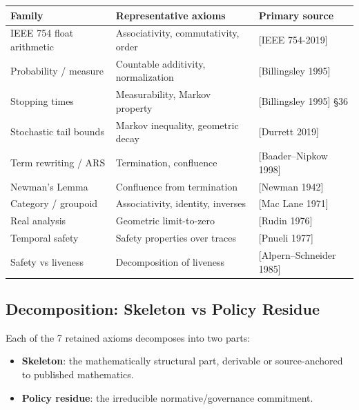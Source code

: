 \begin{center}
\begin{tabular}{lll}
\toprule
Family & Representative axioms & Primary source \\
\midrule
IEEE 754 float arithmetic & Associativity, commutativity, order & [IEEE 754-2019] \\
Probability / measure & Countable additivity, normalization & [Billingsley 1995] \\
Stopping times & Measurability, Markov property & [Billingsley 1995] \S36 \\
Stochastic tail bounds & Markov inequality, geometric decay & [Durrett 2019] \\
Term rewriting / ARS & Termination, confluence & [Baader--Nipkow 1998] \\
Newman's Lemma & Confluence from termination & [Newman 1942] \\
Category / groupoid & Associativity, identity, inverses & [Mac Lane 1971] \\
Real analysis & Geometric limit-to-zero & [Rudin 1976] \\
Temporal safety & Safety properties over traces & [Pnueli 1977] \\
Safety vs liveness & Decomposition of liveness & [Alpern--Schneider 1985] \\
\bottomrule
\end{tabular}
\end{center}


\subsection{Decomposition: Skeleton vs Policy Residue}

Each of the 7 retained axioms decomposes into two parts:
\begin{itemize}
  \item \textbf{Skeleton}: the mathematically structural part, derivable or
        source-anchored to published mathematics.
  \item \textbf{Policy residue}: the irreducible normative/governance commitment.
\end{itemize}

